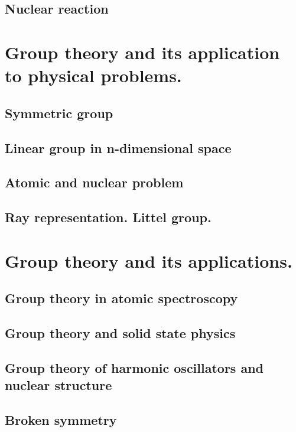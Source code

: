 \documentclass[oneside,12pt]{memoir}
\begin{document}
\section{Nuclear reaction}


\chapter{Group theory and its application to physical problems.}
\PartialToc

\section{Symmetric group}

\section{Linear group in n-dimensional space}

\section{Atomic and nuclear problem}

\section{Ray representation. Littel group.}


\chapter{Group theory and its applications.}
\PartialToc


\section{Group theory in atomic spectroscopy}

\section{Group theory and solid state physics}

\section{Group theory of harmonic oscillators and nuclear structure}

\section{Broken symmetry}
\end{document}
